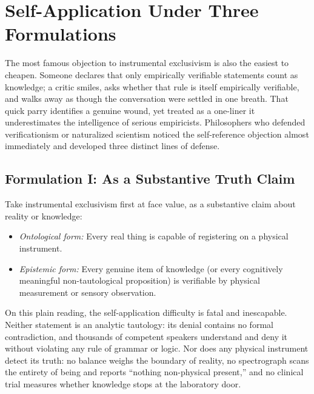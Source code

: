\section{Self-Application Under Three Formulations}

The most famous objection to instrumental exclusivism is also the easiest to cheapen. Someone declares that only empirically verifiable statements count as knowledge; a critic smiles, asks whether that rule is itself empirically verifiable, and walks away as though the conversation were settled in one breath. That quick parry identifies a genuine wound, yet treated as a one-liner it underestimates the intelligence of serious empiricists. Philosophers who defended verificationism or naturalized scientism noticed the self-reference objection almost immediately and developed three distinct lines of defense.

\subsection{Formulation I: As a Substantive Truth Claim}

Take instrumental exclusivism first at face value, as a substantive claim about reality or knowledge:

\begin{itemize}
\item \emph{Ontological form:} Every real thing is capable of registering on a physical instrument.
\item \emph{Epistemic form:} Every genuine item of knowledge (or every cognitively meaningful non-tautological proposition) is verifiable by physical measurement or sensory observation.
\end{itemize}

On this plain reading, the self-application difficulty is fatal and inescapable. Neither statement is an analytic tautology: its denial contains no formal contradiction, and thousands of competent speakers understand and deny it without violating any rule of grammar or logic. Nor does any physical instrument detect its truth: no balance weighs the boundary of reality, no spectrograph scans the entirety of being and reports ``nothing non-physical present,'' and no clinical trial measures whether knowledge stops at the laboratory door.

